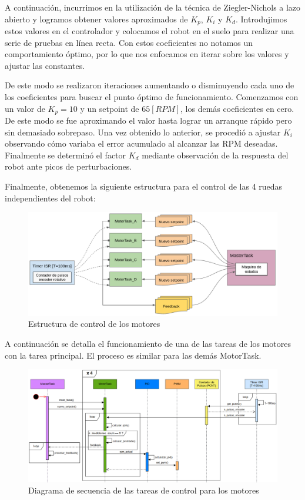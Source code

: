 A continuación, incurrimos en la utilización de la técnica de Ziegler-Nichols a lazo abierto y logramos obtener valores aproximados de $K_p$, $K_i$ y $K_d$. Introdujimos estos valores en el controlador y colocamos el robot en el suelo para realizar una serie de pruebas en línea recta. Con estos coeficientes no notamos un comportamiento óptimo, por lo que nos enfocamos en iterar sobre los valores y ajustar las constantes.

De este modo se realizaron iteraciones aumentando o disminuyendo cada uno de los coeficientes para buscar el punto óptimo de funcionamiento. Comenzamos con un valor de $K_p=10$ y un setpoint de $65[RPM]$, los demás coeficientes en cero. De este modo se fue aproximando el valor hasta lograr un arranque rápido pero sin demasiado sobrepaso. Una vez obtenido lo anterior, se procedió a ajustar $K_i$ observando cómo variaba el error acumulado al alcanzar las RPM deseadas. Finalmente se determinó el factor $K_d$ mediante observación de la respuesta del robot ante picos de perturbaciones.

Finalmente, obtenemos la siguiente estructura para el control de las 4 ruedas independientes del robot:

\begin{figure}[H]
    \centering
    \hspace*{-0.75cm}
    \includegraphics[width=1.1\linewidth]{images/diag_comp_esp32_pid_solo_todos_los_motores.png}
    \caption{Estructura de control de los motores}
    \label{fig:diagcommpesp32pidmotores}
\end{figure}

A continuación se detalla el funcionamiento de una de las tareas de los motores con la tarea principal. El proceso es similar para las demás MotorTask.

\begin{figure}[H]
    \centering
    \hspace*{-1.1cm}
    \includegraphics[width=1.15\linewidth]{images/diag_secuencia_pid_solo.png}
    \caption{Diagrama de secuencia de las tareas de control para los motores}
    \label{fig:diagsecuenciapidsolo}
\end{figure}
